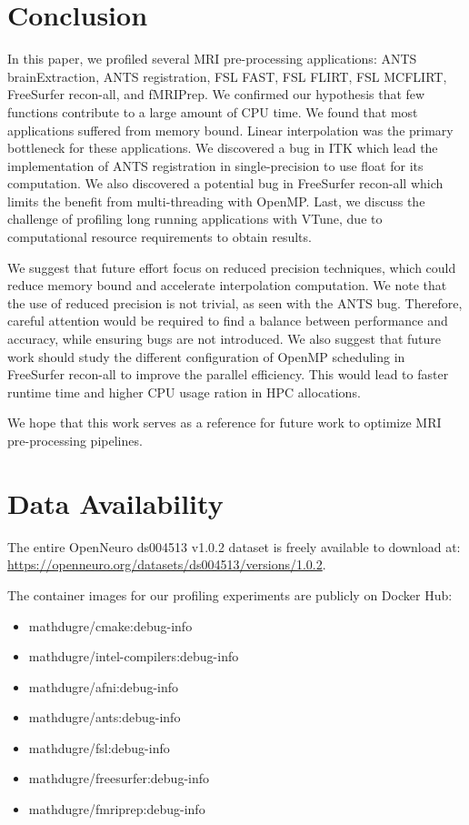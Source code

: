 \documentclass[conference]{IEEEtran}
\begin{document}
\section{Conclusion}
In this paper, we profiled several MRI pre-processing applications: ANTS brainExtraction, ANTS registration, FSL FAST, FSL FLIRT, FSL MCFLIRT, FreeSurfer recon-all, and fMRIPrep. We confirmed our hypothesis that few functions contribute to a large amount of CPU time. We found that most applications suffered from memory bound. Linear interpolation was the primary bottleneck for these applications. We discovered a bug in ITK which lead the implementation of ANTS registration in single-precision to use float for its computation. We also discovered a potential bug in FreeSurfer recon-all which limits the benefit from multi-threading with OpenMP. Last, we discuss the challenge of profiling long running applications with VTune, due to computational resource requirements to obtain results.

We suggest that future effort focus on reduced precision techniques, which could reduce memory bound and accelerate interpolation computation. We note that the use of reduced precision is not trivial, as seen with the ANTS bug. Therefore, careful attention would be required to find a balance between performance and accuracy, while ensuring bugs are not introduced. We also suggest that future work should study the different configuration of OpenMP scheduling in FreeSurfer recon-all to improve the parallel efficiency. This would lead to faster runtime time and higher CPU usage ration in HPC allocations.

We hope that this work serves as a reference for future work to optimize MRI pre-processing pipelines. 
			
			
\section{Data Availability}
\label{sec:data-availability}
The entire OpenNeuro ds004513 v1.0.2 dataset is freely available to download at:
\\\href{https://openneuro.org/datasets/ds004513/versions/1.0.2}{https://openneuro.org/datasets/ds004513/versions/1.0.2}.
	
The container images for our profiling experiments are publicly on Docker Hub:
\begin{itemize}
	\item mathdugre/cmake:debug-info
	\item mathdugre/intel-compilers:debug-info
	\item mathdugre/afni:debug-info
	\item mathdugre/ants:debug-info
	\item mathdugre/fsl:debug-info
	\item mathdugre/freesurfer:debug-info
	\item mathdugre/fmriprep:debug-info
\end{itemize}
	
\end{document}
